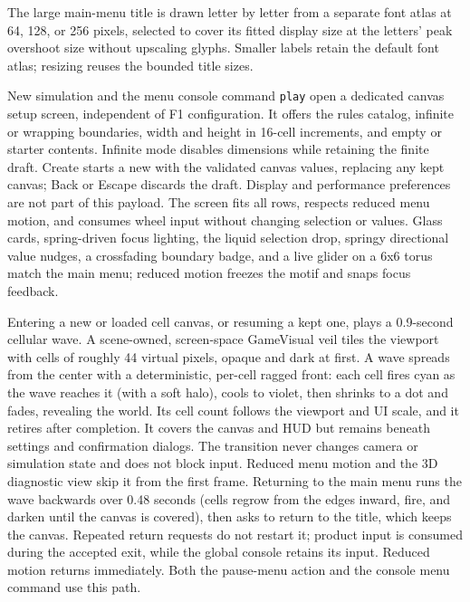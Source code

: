 The large main-menu title is drawn letter by letter from a separate font atlas
at 64, 128, or 256 pixels, selected to cover its fitted display size at the
letters' peak overshoot size without upscaling glyphs. Smaller labels retain
the default font atlas; resizing reuses the bounded title sizes.

New simulation and the menu console command \texttt{play} open a dedicated canvas
setup screen, independent of F1 configuration. It offers the rules catalog,
infinite or wrapping boundaries, width and height in 16-cell increments, and
empty or starter contents. Infinite mode disables dimensions while retaining
the finite draft. Create starts a new  with the
validated canvas values, replacing any kept canvas; Back or Escape discards the
draft. Display and performance preferences are not
part of this payload. The screen fits all rows, respects reduced menu motion,
and consumes wheel input without changing selection or values. Glass cards,
spring-driven focus lighting, the liquid selection drop, springy directional
value nudges, a crossfading boundary badge, and a live glider on a 6x6 torus match
the main menu; reduced motion freezes the motif and snaps focus feedback.

Entering a new or loaded cell canvas, or resuming a kept one, plays a
0.9-second cellular wave. A scene-owned, screen-space GameVisual veil tiles the
viewport with cells of
roughly 44 virtual pixels, opaque and dark at first. A wave spreads from the
center with a deterministic, per-cell ragged front: each cell fires cyan as the
wave reaches it (with a soft halo), cools to violet, then shrinks to a dot and
fades, revealing the world. Its cell count follows the viewport and UI scale,
and it retires after completion. It covers the canvas and HUD but remains beneath
settings and confirmation dialogs. The transition never changes camera or
simulation state and does not block input. Reduced menu motion and the 3D
diagnostic view skip it from the first frame. Returning to the main menu runs
the wave backwards over 0.48 seconds (cells regrow from the edges inward, fire,
and darken until the canvas is covered), then asks  to
return to the title, which keeps the canvas. Repeated return
requests do not restart it; product input is consumed during the accepted exit,
while the global console retains its input. Reduced motion returns immediately.
Both the pause-menu action and the console menu command use this path.

